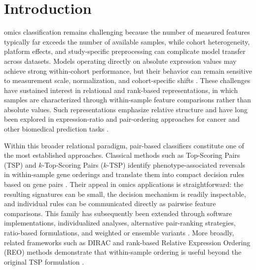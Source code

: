 \documentclass[journal]{IEEEtran}
\begin{document}
\IEEEpeerreviewmaketitle

\section{Introduction}

 omics classification remains challenging because the number of measured features typically far exceeds the number of available samples, while cohort heterogeneity, platform effects, and study-specific preprocessing can complicate model transfer across datasets. Models operating directly on absolute expression values may achieve strong within-cohort performance, but their behavior can remain sensitive to measurement scale, normalization, and cohort-specific shifts \cite{Aitchison1986,Zheng2025}. These challenges have sustained interest in relational and rank-based representations, in which samples are characterized through within-sample feature comparisons rather than absolute values. Such representations emphasize relative structure and have long been explored in expression-ratio and pair-ordering approaches for cancer and other biomedical prediction tasks \cite{Gordon2002,Bo2002,Geman2004,Wu2025}.

Within this broader relational paradigm, pair-based classifiers constitute one of the most established approaches. Classical methods such as Top-Scoring Pairs (TSP) and $k$-Top-Scoring Pairs ($k$-TSP) identify phenotype-associated reversals in within-sample gene orderings and translate them into compact decision rules based on gene pairs \cite{Geman2004,Tan2005}. Their appeal in omics applications is straightforward: the resulting signatures can be small, the decision mechanism is readily inspectable, and individual rules can be communicated directly as pairwise feature comparisons. This family has subsequently been extended through software implementations, individualized analyses, alternative pair-ranking strategies, ratio-based formulations, and weighted or ensemble variants \cite{Lin2009,Magis2012,Marchionni2013,Afsari2015,Wang2015,Huang2022}. More broadly, related frameworks such as DIRAC and rank-based Relative Expression Ordering (REO) methods demonstrate that within-sample ordering is useful beyond the original TSP formulation \cite{Eddy2010,Chen2023,Yan2024,Jin2025,Czajkowski2025}.
\end{document}
